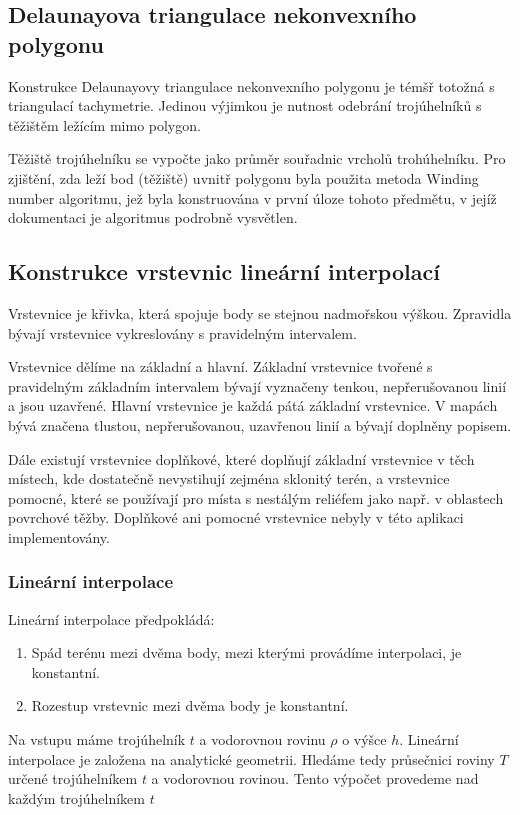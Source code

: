 \documentclass[11pt]{article}
\begin{document}
\subsection{Delaunayova triangulace nekonvexního polygonu}
Konstrukce Delaunayovy triangulace nekonvexního polygonu je témšř totožná s triangulací tachymetrie. Jedinou výjimkou je nutnost odebrání trojúhelníků s těžištěm ležícím mimo polygon. 

Těžiště trojúhelníku se vypočte jako průměr souřadnic vrcholů trohúhelníku. Pro zjištění, zda leží bod (těžiště) uvnitř polygonu byla použita metoda Winding number algoritmu, jež byla konstruována v první úloze tohoto předmětu, v jejíž dokumentaci je algoritmus podrobně vysvětlen.

\subsection{Konstrukce vrstevnic lineární interpolací}
Vrstevnice je křivka, která spojuje body se stejnou nadmořskou výškou. Zpravidla bývají vrstevnice vykreslovány s pravidelným intervalem.

Vrstevnice dělíme na základní a hlavní. Základní vrstevnice tvořené s pravidelným základním intervalem bývají vyznačeny tenkou, nepřerušovanou linií a jsou uzavřené. Hlavní vrstevnice je každá pátá základní vrstevnice. V mapách bývá značena tlustou, nepřerušovanou, uzavřenou linií a bývají doplněny popisem.

Dále existují vrstevnice doplňkové, které doplňují základní vrstevnice v těch místech, kde dostatečně nevystihují zejména sklonitý terén, a vrstevnice pomocné, které se používají pro místa s nestálým reliéfem jako např. v oblastech povrchové těžby. Doplňkové ani pomocné vrstevnice nebyly v této aplikaci implementovány.

\subsubsection{Lineární interpolace}
Lineární interpolace předpokládá:
\begin{enumerate}
\item Spád terénu mezi dvěma body, mezi kterými provádíme interpolaci, je konstantní.
\item Rozestup vrstevnic mezi dvěma body je konstantní.
\end{enumerate}

Na vstupu máme trojúhelník $t$ a vodorovnou rovinu $\rho$ o výšce $h$. Lineární interpolace je založena na analytické geometrii. Hledáme tedy průsečnici roviny $T$ určené trojúhelníkem $t$ a vodorovnou rovinou. Tento výpočet provedeme nad každým trojúhelníkem $t$
\end{document}
